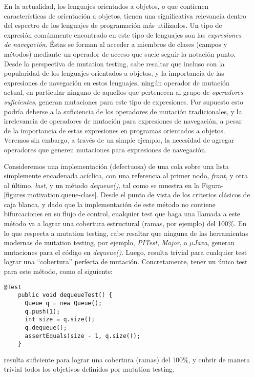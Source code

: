 En la actualidad, los lenguajes orientados a objetos, o que contienen caracter\'isticas de orientaci\'on a objetos, tienen una significativa relevancia dentro del espectro de los lenguajes de programaci\'on m\'as utilizados. Un tipo de expresi\'on com\'unmente encontrado en este tipo de lenguajes son las \emph{expresiones de navegaci\'on}. \'Estas se forman al acceder a miembros de clases (campos y m\'etodos) mediante un operador de acceso que suele seguir la notaci\'on punto. Desde la perspectiva de mutation testing, cabe resaltar que incluso con la popularidad de los lenguajes orientados a objetos, y la importancia de las expresiones de navegaci\'on en estos lenguajes, ning\'un operador de mutaci\'on actual, en particular ninguno de aquellos que pertenecen al grupo de \emph{operadores suficientes}, generan mutaciones para este tipo de expresiones. Por supuesto esto podr\'ia deberse a la suficiencia de los operadores de mutaci\'on tradicionales, y la irrelevancia de operadores de mutaci\'on para expresiones de navegaci\'on, a pesar de la importancia de estas expresiones en programas orientados a objetos. Veremos sin embargo, a trav\'es de un simple ejemplo, la necesidad de agregar operadores que generen mutaciones para expresiones de navegaci\'on.

Consideremos una implementaci\'on (defectuosa) de una cola sobre una lista simplemente encadenada ac\'iclica, con una referencia al primer nodo, \emph{front}, y otra al \'ultimo, \emph{last}, y un m\'etodo \emph{dequeue()}, tal como se muestra en la Figura-\ref{figures.motivation.queue-class}. Desde el punto de vista de los criterios cl\'asicos de caja blanca, y dado que la implementaci\'on de este m\'etodo no contiene bifurcaciones en su flujo de control, cualquier test que haga una llamada a este m\'etodo va a lograr una cobertura estructural (ramas, por ejemplo) del 100\%. En lo que respecta a mutation testing, cabe resaltar que ninguna de las herramientas modernas de mutation testing, por ejemplo, \emph{PITest}, \emph{Major}, o \emph{$\mu$Java}, generan mutaciones para el c\'odigo en \emph{dequeue()}. Luego, resulta trivial para cualquier test lograr una ``cobertura'' perfecta de mutaci\'on. Concretamente, tener un \'unico test para este m\'etodo, como el siguiente:

\begin{center}
	\begin{lstlisting}[frame=tlrb, mathescape=true]
    @Test
    public void dequeueTest() {
      Queue q = new Queue();
      q.push(1);
      int size = q.size();
      q.dequeue();
      assertEquals(size - 1, q.size());
    }
	\end{lstlisting}
\end{center}
resulta suficiente para lograr una cobertura (ramas) del 100\%, y cubrir de manera trivial todos los objetivos definidos por mutation testing.

